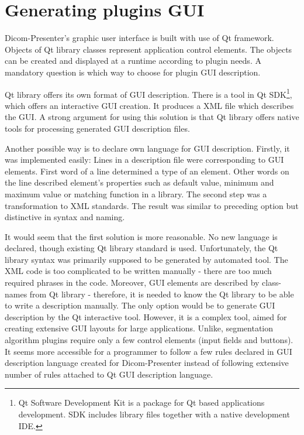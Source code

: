 \section{Generating plugins GUI}

Dicom-Presenter's graphic user interface is built with use of Qt framework. Objects of Qt library classes represent application control elements. The objects can be created and displayed at a runtime according to plugin needs. A mandatory question is which way to choose for plugin GUI description.

Qt library offers its own format of GUI description. There is a tool in Qt SDK\footnote{Qt Software Development Kit is a package for Qt based applications development. SDK includes library files together with a native development IDE.}, which offers an interactive GUI creation. It produces a XML file which describes the GUI. A strong argument for using this solution is that Qt library offers native tools for processing generated GUI description files.

Another possible way is to declare own language for GUI description. Firstly, it was implemented easily: Lines in a description file were corresponding to GUI elements. First word of a line determined a type of an element. Other words on the line described element's properties such as default value, minimum and maximum value or matching function in a library. The second step was a transformation to XML standards. The result was similar to preceding option but distinctive in syntax and naming. 

It would seem that the first solution is more reasonable. No new language is declared, though existing Qt library standard is used. Unfortunately, the Qt library syntax was primarily supposed to be generated by automated tool. The XML code is too complicated to be written manually - there are too much required phrases in the code. Moreover, GUI elements are described by class-names from Qt library - therefore, it is needed to know the Qt library to be able to write a description manually. The only option would be to generate GUI description by the Qt interactive tool. However, it is a complex tool, aimed for creating extensive GUI layouts for large applications. Unlike, segmentation algorithm plugins require only a few control elements (input fields and buttons). It seems more accessible for a programmer to follow a few rules declared in GUI description language created for Dicom-Presenter instead of following extensive number of rules attached to Qt GUI description language.

